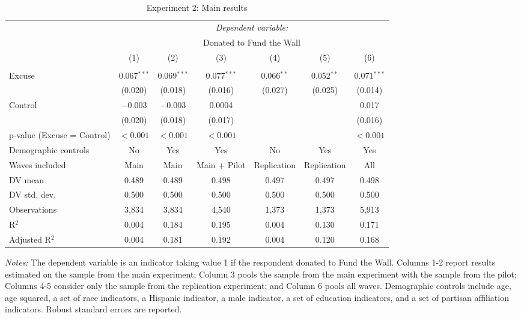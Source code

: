 
\begin{table}[!htbp] \centering 
  \caption{Experiment 2: Main results} 
  \label{t:2-main} 
\begin{threeparttable}
\begin{tabular}{@{\hspace{5pt}}l@{\hspace{5pt}}cccccc} 
\toprule 
 & \multicolumn{6}{c}{\textit{Dependent variable:}} \\ 
\cmidrule(rr){2-7} 
 & \multicolumn{6}{c}{Donated to Fund the Wall} \\ 
 \cmidrule(rr){2-7}
 & (1) & (2) & (3) & (4) & (5) & (6)\\ 
\midrule  
\\[-2.1ex] Excuse & 0.067$^{***}$ & 0.069$^{***}$ & 0.077$^{***}$ & 0.066$^{**}$ & 0.052$^{**}$ & 0.071$^{***}$ \\ 
  & (0.020) & (0.018) & (0.016) & (0.027) & (0.025) & (0.014) \\ 
 \addlinespace 
 Control & $-$0.003 & $-$0.003 & 0.0004 &  &  & 0.017 \\ 
  & (0.020) & (0.018) & (0.017) &  &  & (0.016) \\ 
 \addlinespace 
p-value (Excuse = Control) & $<0.001$ & $<0.001$ & $<0.001$ &  &  & $<0.001$ \\ 
\midrule  
Demographic controls & No & Yes & Yes & No & Yes & Yes \\ 
Waves included & Main & Main & Main + Pilot & Replication & Replication & All \\ 
\midrule
\addlinespace
DV mean & 0.489 & 0.489 & 0.498 & 0.497 & 0.497 & 0.498 \\
DV std. dev. & 0.500 & 0.500 & 0.500 & 0.500 & 0.500 & 0.500 \\
Observations & 3,834 & 3,834 & 4,540 & 1,373 & 1,373 & 5,913 \\ 
R$^{2}$ & 0.004 & 0.184 & 0.195 & 0.004 & 0.130 & 0.171 \\ 
Adjusted R$^{2}$ & 0.004 & 0.181 & 0.192 & 0.004 & 0.120 & 0.168 \\ 
\bottomrule 
\end{tabular} 
\begin{tablenotes}
\footnotesize
\item \textit{Notes:} The dependent variable is an indicator taking value 1 if the respondent donated to Fund the Wall. Columns 1-2 report results estimated on the sample from the main experiment; Column 3 pools the sample from the main experiment with the sample from the pilot; Columns 4-5 consider only the sample from the replication experiment; and Column 6 pools all waves. Demographic controls include age, age squared, a set of race indicators, a Hispanic indicator, a male indicator, a set of education indicators, and a set of partisan affiliation indicators. Robust standard errors are reported.
\end{tablenotes}
\end{threeparttable}
\end{table} 
